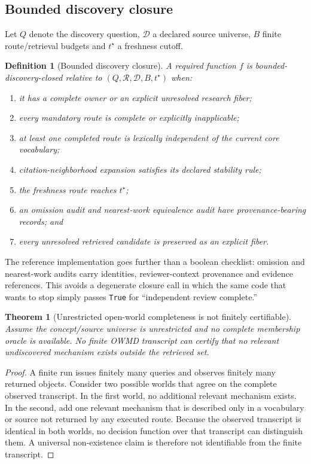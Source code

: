 \documentclass[11pt]{article}
\newtheorem{definition}{Definition}
\newtheorem{theorem}{Theorem}
\begin{document}
\subsection{Bounded discovery closure}

Let \(Q\) denote the discovery question, \(\mathcal D\) a declared source universe, \(B\) finite route/retrieval budgets and \(t^\star\) a freshness cutoff.

\begin{definition}[Bounded discovery closure]
A required function \(f\) is \emph{bounded-discovery-closed} relative to \((Q,\mathcal R,\mathcal D,B,t^\star)\) when:
\begin{enumerate}[leftmargin=*]
\item it has a complete owner or an explicit unresolved research fiber;
\item every mandatory route is complete or explicitly inapplicable;
\item at least one completed route is lexically independent of the current core vocabulary;
\item citation-neighborhood expansion satisfies its declared stability rule;
\item the freshness route reaches \(t^\star\);
\item an omission audit and nearest-work equivalence audit have provenance-bearing records; and
\item every unresolved retrieved candidate is preserved as an explicit fiber.
\end{enumerate}
\end{definition}

The reference implementation goes further than a boolean checklist: omission and nearest-work audits carry identities, reviewer-context provenance and evidence references. This avoids a degenerate closure call in which the same code that wants to stop simply passes \texttt{True} for ``independent review complete.''

\begin{theorem}[Unrestricted open-world completeness is not finitely certifiable]
Assume the concept/source universe is unrestricted and no complete membership oracle is available. No finite OWMD transcript can certify that no relevant undiscovered mechanism exists outside the retrieved set.
\end{theorem}

\begin{proof}
A finite run issues finitely many queries and observes finitely many returned objects. Consider two possible worlds that agree on the complete observed transcript. In the first world, no additional relevant mechanism exists. In the second, add one relevant mechanism that is described only in a vocabulary or source not returned by any executed route. Because the observed transcript is identical in both worlds, no decision function over that transcript can distinguish them. A universal non-existence claim is therefore not identifiable from the finite transcript.
\end{proof}
\end{document}

